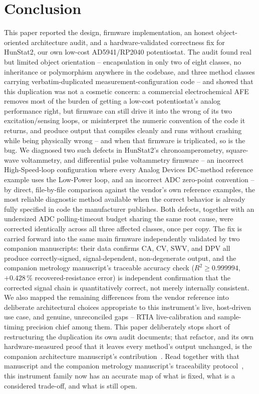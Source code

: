\section{Conclusion}
\label{sec:conclusion}

This paper reported the design, firmware implementation, an honest
object-oriented architecture audit, and a hardware-validated correctness
fix for HunStat2, our own low-cost AD5941/RP2040 potentiostat. The audit
found real but limited object orientation -- encapsulation in only two of
eight classes, no inheritance or polymorphism anywhere in the codebase,
and three method classes carrying verbatim-duplicated measurement-configuration
code -- and showed that this duplication was not a cosmetic concern: a
commercial electrochemical AFE removes most of the burden of getting a
low-cost potentiostat's analog performance right, but firmware can still
drive it into the wrong of its two excitation/sensing loops, or
misinterpret the numeric convention of the code it returns, and produce
output that compiles cleanly and runs without crashing while being
physically wrong -- and when that firmware is triplicated, so is the bug.
We diagnosed two such defects in HunStat2's chronoamperometry,
square-wave voltammetry, and differential pulse voltammetry firmware -- an
incorrect High-Speed-loop configuration where every Analog Devices
DC-method reference example uses the Low-Power loop, and an incorrect ADC
zero-point convention -- by direct, file-by-file comparison against the
vendor's own reference examples, the most reliable diagnostic method
available when the correct behavior is already fully specified in code the
manufacturer publishes. Both defects, together with an undersized ADC
polling-timeout budget sharing the same root cause, were corrected
identically across all three affected classes, once per copy. The fix is
carried forward into the same main firmware independently validated by
two companion manuscripts: their data confirms CA, CV, SWV,
and DPV all produce correctly-signed, signal-dependent, non-degenerate
output, and the companion metrology manuscript's traceable accuracy check
($R^2\geq0.999994$, $+0.428\,\%$ recovered-resistance error) is
independent confirmation that the corrected signal chain is quantitatively
correct, not merely internally consistent. We also mapped the remaining
differences from the vendor reference into deliberate architectural
choices appropriate to this instrument's live, host-driven use case, and
genuine, unreconciled gaps -- RTIA live-calibration and sample-timing
precision chief among them. This paper deliberately stops short of
restructuring the duplication its own audit documents; that refactor, and
its own hardware-measured proof that it leaves every method's output
unchanged, is the companion architecture manuscript's
contribution~\cite{clement2026architecture}. Read together with that
manuscript and the companion metrology manuscript's traceability
protocol~\cite{clement2026linearity}, this instrument family now has an
accurate map of what is fixed, what is a considered trade-off, and what is
still open.
